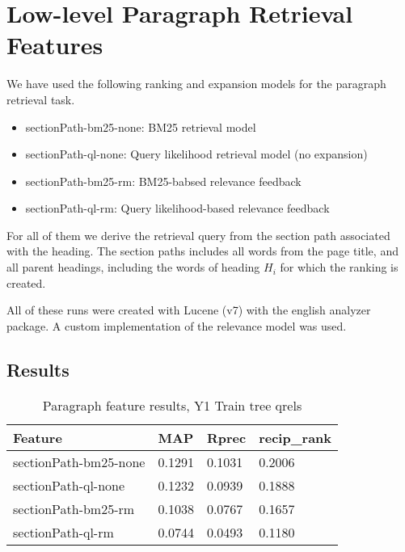 \documentclass{article}
\begin{document}

\section{Low-level Paragraph Retrieval Features}\label{sec:para}

We have used the following ranking and expansion models for the paragraph retrieval task.
\begin{itemize}
    \item sectionPath-bm25-none: BM25 retrieval model
    \item sectionPath-ql-none: Query likelihood retrieval model (no expansion)
    \item sectionPath-bm25-rm: BM25-babsed relevance feedback
    \item sectionPath-ql-rm: Query likelihood-based relevance feedback
\end{itemize}
For all of them we derive the retrieval query from the section path associated with the heading. The section paths includes all words from the page title, and all parent headings, including the words of heading $H_i$ for which the ranking is created.

All of these runs were created with Lucene (v7) with the english analyzer package. A custom implementation of the relevance model \cite{lavrenko2017relevance} was used.

\subsection{Results}

\begin{table}[tb]
\centering
\begin{tabular}{l l l l}
\hline
\textbf{Feature} & \textbf{MAP} & \textbf{Rprec} & \textbf{recip\_rank}\\
\hline
sectionPath-bm25-none & 0.1291 & 0.1031 & 0.2006 \\
sectionPath-ql-none & 0.1232 & 0.0939 & 0.1888 \\
sectionPath-bm25-rm & 0.1038 & 0.0767 & 0.1657 \\
sectionPath-ql-rm & 0.0744 & 0.0493 & 0.1180 \\
\hline
\end{tabular}
\caption{Paragraph feature results, Y1 Train tree qrels}\label{tab:para}
\end{table}
\end{document}
